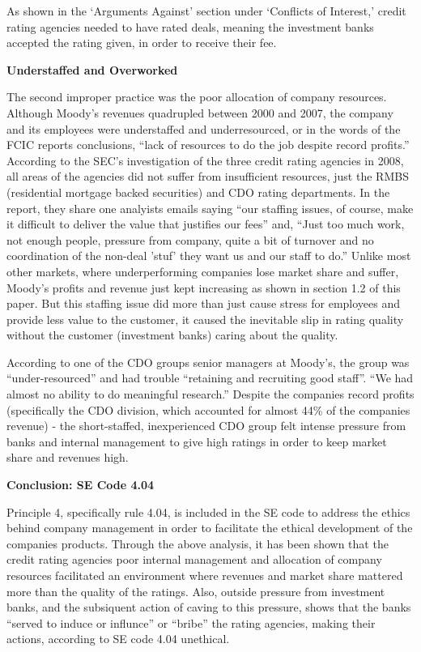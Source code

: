 \documentclass[11pt]{article}
\begin{document}
\begin{multicols}{2}
As shown in the `Arguments Against' section under `Conflicts of Interest,' credit rating agencies needed to have rated deals, meaning the investment banks accepted the rating given, in order to receive their fee. \cite[p.210]{govtReport} 

\textbf{Understaffed and Overworked}

The second improper practice was the poor allocation of company resources.  Although Moody's revenues quadrupled between 2000 and 2007, the company and its employees were understaffed and underresourced, or in the words of the FCIC reports conclusions, ``lack of resources to do the job despite record profits.'' \cite[p. xxv]{govtReport}  According to the SEC's investigation of the three credit rating agencies in 2008, all areas of the agencies did not suffer from insufficient resources, just the RMBS (residential mortgage backed securities) and CDO rating departments. \cite{secCRAreport}  In the report, they share one analyists emails saying ``our staffing issues, of course, make it difficult to deliver the value that justifies our fees'' and, ``Just too much work, not enough people, pressure from company, quite a bit of turnover and no coordination of the non-deal 'stuf' they want us and our staff to do.'' \cite{secCRAreport}  Unlike most other markets, where underperforming companies lose market share and suffer, Moody's profits and revenue just kept increasing as shown in section 1.2 of this paper.  But this staffing issue did more than just cause stress for employees and provide less value to the customer, it caused the inevitable slip in rating quality without the customer (investment banks) caring about the quality.   

According to one of the CDO groups senior managers at Moody's, the group was ``under-resourced'' and had trouble ``retaining and recruiting good staff''. ``We had almost no ability to do meaningful research.'' \cite[p. 149]{govtReport}  Despite the companies record profits (specifically the CDO division, which accounted for almost 44\% of the companies revenue) - the short-staffed, inexperienced CDO group felt intense pressure from banks and internal management to give high ratings in order to keep market share and revenues high. \cite[pg. 149-150]{govtReport}

\textbf{Conclusion: SE Code 4.04}

Principle 4, specifically rule 4.04, is included in the SE code to address the ethics behind company management in order to facilitate the ethical development of the companies products.  Through the above analysis, it has been shown that the credit rating agencies poor internal management and allocation of company resources facilitated an environment where revenues and market share mattered more than the quality of the ratings.  Also, outside pressure from investment banks, and the subsiquent action of caving to this pressure, shows that the banks ``served to induce or influnce'' or ``bribe'' the rating agencies, making their actions, according to SE code 4.04 unethical.


\end{multicols}
\end{document}
